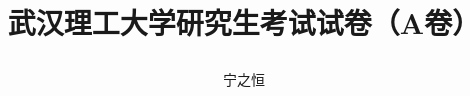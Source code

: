 \def\myTitle{\heiti 武汉理工大学研究生考试试卷（A卷）}
\def\myAuthor{宁之恒}
% 


\title{

    {\Huge{\textbf{\myTitle}}}}
\author{\myAuthor}
\date{}
\maketitle




